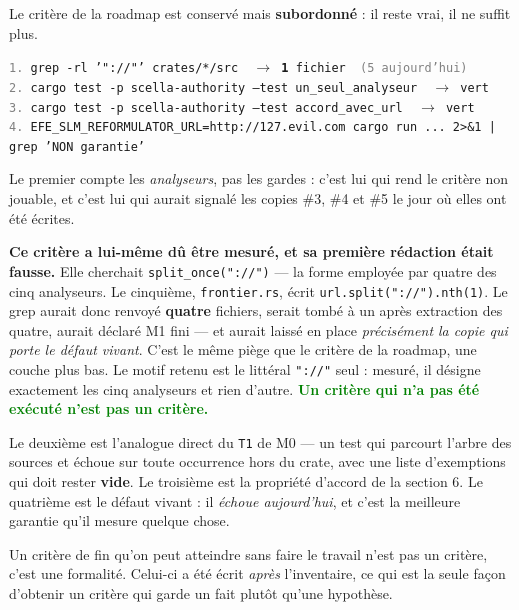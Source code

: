 \documentclass[10pt]{article}
\newcommand{\best}[1]{\textcolor{green}{\textbf{#1}}}
\newcommand{\sz}[1]{\textcolor{grey}{\small\textsf{#1}}}
\newcommand{\code}[1]{\texttt{\small #1}}
\newcommand{\fl}{$\rightarrow$}
\begin{document}
Le critère de la roadmap est conservé mais \textbf{subordonné} : il reste vrai, il ne suffit plus.

\begin{extrait}
\code{\sz{1.}\ grep -rl '"://"' crates/*/src \ \fl{} \textbf{1} fichier \ \sz{(5 aujourd'hui)}} \\
\code{\sz{2.}\ cargo test -p scella-authority --test un\_seul\_analyseur \ \fl{} vert} \\
\code{\sz{3.}\ cargo test -p scella-authority --test accord\_avec\_url \ \fl{} vert} \\
\code{\sz{4.}\ EFE\_SLM\_REFORMULATOR\_URL=http://127.evil.com cargo run ... 2>\&1 | grep 'NON garantie'}
\end{extrait}

Le premier compte les \emph{analyseurs}, pas les gardes : c'est lui qui rend le critère non jouable,
et c'est lui qui aurait signalé les copies \#3, \#4 et \#5 le jour où elles ont été écrites.

\begin{alerte}
\textbf{Ce critère a lui-même dû être mesuré, et sa première rédaction était fausse.} Elle cherchait
\code{split\_once("://")} --- la forme employée par quatre des cinq analyseurs. Le cinquième,
\code{frontier.rs}, écrit \code{url.split("://").nth(1)}. Le grep aurait donc renvoyé \textbf{quatre}
fichiers, serait tombé à un après extraction des quatre, aurait déclaré M1 fini --- et aurait laissé
en place \emph{précisément la copie qui porte le défaut vivant}. C'est le même piège que le critère
de la roadmap, une couche plus bas. Le motif retenu est le littéral \code{"://"} seul : mesuré, il
désigne exactement les cinq analyseurs et rien d'autre. \best{Un critère qui n'a pas été exécuté
n'est pas un critère.}
\end{alerte} Le
deuxième est l'analogue direct du \code{T1} de M0 --- un test qui parcourt l'arbre des sources et
échoue sur toute occurrence hors du crate, avec une liste d'exemptions qui doit rester
\textbf{vide}. Le troisième est la propriété d'accord de la section 6. Le quatrième est le défaut
vivant : il \emph{échoue aujourd'hui}, et c'est la meilleure garantie qu'il mesure quelque chose.

\begin{these}
Un critère de fin qu'on peut atteindre sans faire le travail n'est pas un critère, c'est une
formalité. Celui-ci a été écrit \emph{après} l'inventaire, ce qui est la seule façon d'obtenir un
critère qui garde un fait plutôt qu'une hypothèse.
\end{these}
\end{document}
